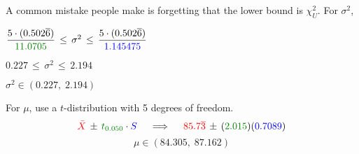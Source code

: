 \nl A common mistake people make is forgetting that the lower bound is $\chi^2_U$. For $\sigma^2$,
\begin{center}
	$\dfrac{5\cdot(0.502\overline{6})}{\color{ggreen}11.0705}\color{black} \, \leq \, \sigma^2 \,\leq\, \dfrac{5\cdot(0.502\overline{6})}{\color{blue}1.145475\color{black}} $

	\nl $0.227 \,\leq\, \sigma^2 \,\leq\, 2.194$
	
	\nl $\sigma^2 \in (0.227,\;2.194)$\end{center}


\nl For $\mu$, use a $t$-distribution with 5 degrees of freedom.
$$\red{\Xbar} \pmp \color{ggreen}t_{0.050}\color{black} \cdot \color{blue}S\color{black}\quad\implies\quad \red{85.7\overline{3}} \pmp (\color{ggreen}2.015\color{black})(\color{blue}0.7089\color{black})$$
$$\mu \in (84.305,\; 87.162)$$